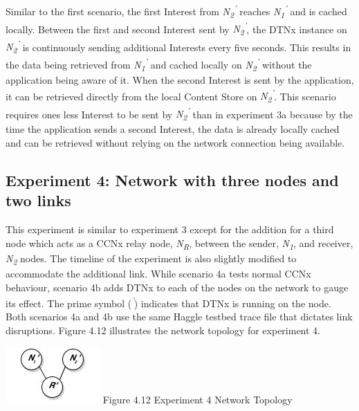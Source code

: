\documentclass[a4paper,12pt]{report}      %
\begin{document}
Similar to the first scenario, the first Interest from \emph{N\textsubscript{2}\textsuperscript{'}} reaches \emph{N\textsubscript{1}\textsuperscript{'}} and is cached locally. Between the first and second Interest sent by \emph{N\textsubscript{2}\textsuperscript{'}}, the DTNx instance on \emph{N\textsubscript{2}\textsuperscript{'}} is continuously sending additional Interests every five seconds. This results in the data being retrieved from \emph{N\textsubscript{1}\textsuperscript{'}} and cached locally on \emph{N\textsubscript{2}\textsuperscript{'}} without the application being aware of it. When the second Interest is sent by the application, it can be retrieved directly from the local Content Store on \emph{N\textsubscript{2}\textsuperscript{'}}. This scenario requires ones less Interest to be sent by \emph{N\textsubscript{2}\textsuperscript{'}} than in experiment 3a because by the time the application sends a second Interest, the data is already locally cached and can be retrieved without relying on the network connection being available.

\subsection{Experiment 4: Network with three nodes and two links}

This experiment is similar to experiment 3 except for the addition for a third node which acts as a CCNx relay node, \emph{N\textsubscript{R}}, between the sender, \emph{N\textsubscript{1}}, and receiver, \emph{N\textsubscript{2}} nodes. The timeline of the experiment is also slightly modified to accommodate the additional link. While scenario 4a tests normal CCNx behaviour, scenario 4b adds DTNx to each of the nodes on the network to gauge its effect. The prime symbol (\emph{\textsuperscript{'}}) indicates that DTNx is running on the node. Both scenarios 4a and 4b use the same Haggle testbed trace file that dictates link disruptions. Figure 4.12 illustrates the network topology for experiment 4.

\begin{center}
\includegraphics[scale=0.75]{exp4topo.jpg}\newline
Figure 4.12 Experiment 4 Network Topology 
\end{center}
\end{document}
